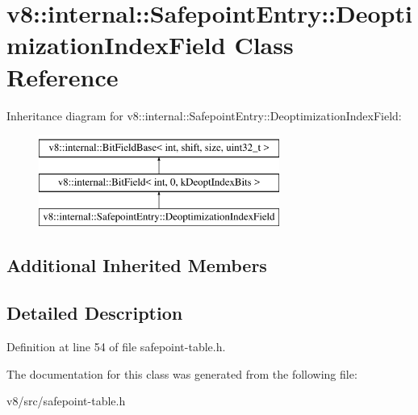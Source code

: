 \hypertarget{classv8_1_1internal_1_1SafepointEntry_1_1DeoptimizationIndexField}{}\section{v8\+:\+:internal\+:\+:Safepoint\+Entry\+:\+:Deoptimization\+Index\+Field Class Reference}
\label{classv8_1_1internal_1_1SafepointEntry_1_1DeoptimizationIndexField}
Inheritance diagram for v8\+:\+:internal\+:\+:Safepoint\+Entry\+:\+:Deoptimization\+Index\+Field\+:\begin{figure}[H]
\begin{center}
\leavevmode
\includegraphics[height=3.000000cm]{classv8_1_1internal_1_1SafepointEntry_1_1DeoptimizationIndexField}
\end{center}
\end{figure}
\subsection*{Additional Inherited Members}


\subsection{Detailed Description}


Definition at line 54 of file safepoint-\/table.\+h.



The documentation for this class was generated from the following file\+:\begin{DoxyCompactItemize}
\item 
v8/src/safepoint-\/table.\+h\end{DoxyCompactItemize}
